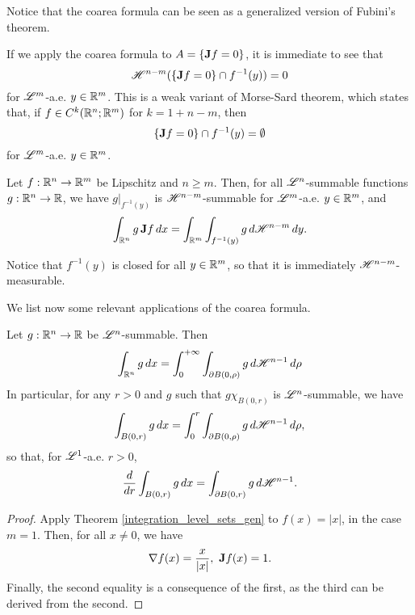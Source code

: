 Notice that the coarea formula can be seen as a generalized version of Fubini's theorem.

\begin{remark}
If we apply the coarea formula to $A = \{ {\bf J} f = 0 \}$, it is immediate to see that
\begin{equation*}
\mathscr{H}^{n - m}( \{ {\bf J} f = 0 \} \cap f^{-1}(y)) = 0
\end{equation*}
for $\mathscr{L}^{m}$-a.e. $y \in \mathbb{R}^{m}$. This is a weak variant of Morse-Sard theorem, which states that, if $f \in C^{k}(\mathbb{R}^{n}; \mathbb{R}^{m})$ for $k = 1 + n - m$, then
\begin{equation*}
\{{\bf J} f = 0 \} \cap f^{-1}(y) = \emptyset
\end{equation*}
for $\mathscr{L}^{m}$-a.e. $y \in \mathbb{R}^{m}$.
\end{remark}

\begin{theorem}\label{integration_level_sets_gen}
Let $f : \mathbb{R}^{n} \to \mathbb{R}^{m}$ be Lipschitz and $n \ge m$. Then, for all $\mathscr{L}^{n}$-summable functions $g : \mathbb{R}^{n} \to \mathbb{R}$, we have $g|_{f^{-1}(y)}$ is $\mathscr{H}^{n - m}$-summable for $\mathscr{L}^{m}$-a.e. $y \in \mathbb{R}^{m}$, and
\begin{equation} \label{eq:integration_level_sets_gen}
\int_{\mathbb{R}^{n}} g \, {\bf J} f \,dx = \int_{\mathbb{R}^{m}} \int_{f^{-1}(y)} g \, d \mathscr{H}^{n - m} \, dy.
\end{equation}
\end{theorem}

\begin{remark}
Notice that $f^{-1}(y)$ is closed for all $y \in \mathbb{R}^{m}$, so that it is immediately $\mathscr{H}^{n - m}$-measurable.
\end{remark}

We list now some relevant applications of the coarea formula.

\begin{theorem} \label{polar_coordinates}
Let $g : \mathbb{R}^{n} \to \mathbb{R}$ be $\mathscr{L}^{n}$-summable. Then
\begin{equation*} 
\int_{\mathbb{R}^{n}} g \, dx = \int_{0}^{+\infty} \int_{\partial B(0, \rho)} g \, d \mathscr{H}^{n - 1} \, d \rho
\end{equation*}
In particular, for any $r > 0$ and $g$ such that $g \chi_{B(0, r)}$ is $\mathscr{L}^{n}$-summable, we have
\begin{equation*}
\int_{B(0, r)} g \, dx = \int_{0}^{r} \int_{\partial B(0, \rho)} g \, d \mathscr{H}^{n - 1} \, d \rho,
\end{equation*}
so that, for $\mathscr{L}^{1}$-a.e. $r > 0$,
\begin{equation*}
\frac{d}{dr} \int_{B(0, r)} g \, dx = \int_{\partial B(0, r)} g \, d \mathscr{H}^{n - 1}.
\end{equation*}
\end{theorem}
\begin{proof}
Apply Theorem \ref{integration_level_sets_gen} to $f(x) = |x|$, in the case $m = 1$. Then, for all $x \neq 0$, we have $$\nabla f(x) = \frac{x}{|x|}, \ {\bf J} f(x) = 1.$$
Finally, the second equality is a consequence of the first, as the third can be derived from the second.
\end{proof}

